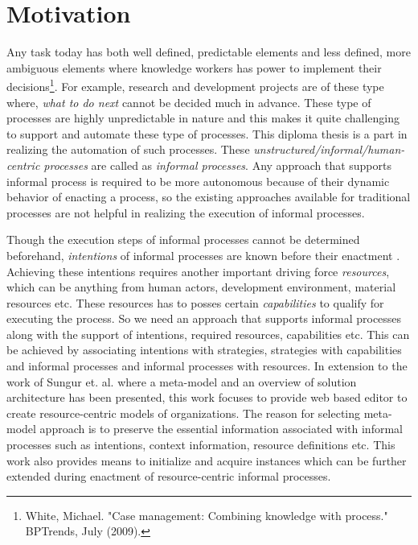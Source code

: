 \section{Motivation}
\label{sec:motivation}
Any task today has both well defined, predictable elements and less defined, more ambiguous elements where knowledge workers has power to implement their decisions\footnote{White, Michael. "Case management: Combining knowledge with process." BPTrends, July (2009).}. For example, research and development projects are of these type where, \textit{what to do next} cannot be decided much in advance. These type of processes are highly unpredictable in nature and this makes it quite challenging to support and automate these type of processes. This diploma thesis is a part in realizing the automation of such processes. These \textit{unstructured/informal/human-centric processes} are called as \textit{informal processes}\cite{Sungur2014}. Any approach that supports informal process is required to be more autonomous because of their dynamic behavior of enacting a process, so the existing approaches available for traditional processes are not helpful in realizing the execution of informal processes.  


Though the execution steps of informal processes cannot be determined beforehand, \textit{intentions} of informal processes are known before their enactment \cite{Sungur2015}. Achieving these intentions requires another important driving force \textit{resources}, which can be anything from human actors, development environment, material resources etc. These resources has to posses certain \textit{capabilities} to qualify for executing the process. So we need an approach that supports informal processes along with the support of intentions, required resources, capabilities etc. This can be achieved by associating intentions with strategies, strategies with capabilities and informal processes and informal processes with resources. In extension to the work of Sungur et. al. \cite{Sungur2014a} where a meta-model and an overview of solution architecture has been presented, this work  focuses to provide web based  editor to create resource-centric models of organizations. The reason for selecting meta-model approach is to preserve the essential information associated with informal processes such as intentions, context information, resource definitions etc.  This work also provides means to initialize and acquire instances which can be further extended during enactment of resource-centric informal processes.  

